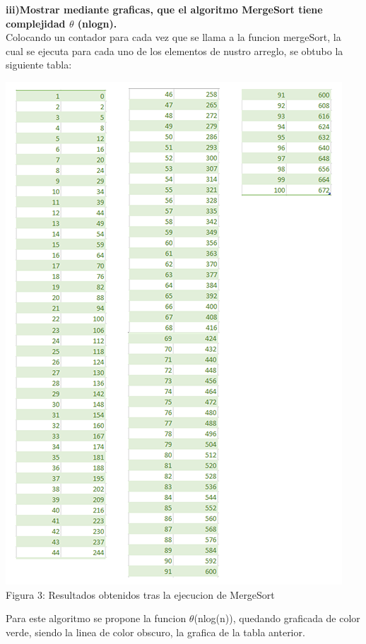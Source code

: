 \documentclass[spanish]{article}
\begin{document}
	\newpage
	{\large{\bf  iii)Mostrar mediante graficas, que el algoritmo MergeSort tiene complejidad $\theta$ (nlogn).}}\\
	Colocando un contador para cada vez que se llama a la funcion mergeSort, la cual se ejecuta para cada uno de los elementos de nustro arreglo, se obtubo la siguiente tabla:\\
	\begin{center}
	\includegraphics[scale=.5]{./imagenes/tablas.png}\\
		Figura 3: Resultados obtenidos tras la ejecucion de MergeSort
	\end{center}
	Para este algoritmo se propone la funcion $\theta$(nlog(n)), quedando graficada de color verde, siendo la linea de color obscuro, la grafica de la tabla anterior.
\end{document}
